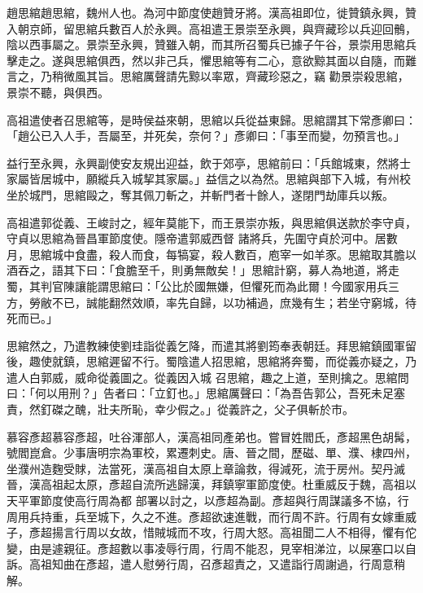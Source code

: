 \begin{pinyinscope}
 趙思綰趙思綰，魏州人也。為河中節度使趙贊牙將。漢高祖即位，徙贊鎮永興，贊入朝京師，留思綰兵數百人於永興。高祖遣王景崇至永興，與齊藏珍以兵迎回鶻，陰以西事屬之。景崇至永興，贊雖入朝，而其所召蜀兵已據子午谷，景崇用思綰兵擊走之。遂與思綰俱西，然以非己兵，懼思綰等有二心，意欲黥其面以自隨，而難言之，乃稍微風其旨。思綰厲聲請先黥以率眾，齊藏珍惡之，竊
 勸景崇殺思綰，景崇不聽，與俱西。



 高祖遣使者召思綰等，是時侯益來朝，思綰以兵從益東歸。思綰謂其下常彥卿曰：「趙公已入人手，吾屬至，并死矣，奈何？」彥卿曰：「事至而變，勿預言也。」



 益行至永興，永興副使安友規出迎益，飲于郊亭，思綰前曰：「兵館城東，然將士家屬皆居城中，願縱兵入城挈其家屬。」益信之以為然。思綰與部下入城，有州校坐於城門，思綰毆之，奪其佩刀斬之，并斬門者十餘人，遂閉門劫庫兵以叛。



 高祖遣郭從義、王峻討之，經年莫能下，而王景崇亦叛，與思綰俱送款於李守貞，守貞以思綰為晉昌軍節度使。隱帝遣郭威西督
 諸將兵，先圍守貞於河中。居數月，思綰城中食盡，殺人而食，每犒宴，殺人數百，庖宰一如羊豕。思綰取其膽以酒吞之，語其下曰：「食膽至千，則勇無敵矣！」思綰計窮，募人為地道，將走蜀，其判官陳讓能謂思綰曰：「公比於國無嫌，但懼死而為此爾！今國家用兵三方，勞敝不已，誠能翻然效順，率先自歸，以功補過，庶幾有生；若坐守窮城，待死而已。」



 思綰然之，乃遣教練使劉珪詣從義乞降，而遣其將劉筠奉表朝廷。拜思綰鎮國軍留後，趣使就鎮，思綰遲留不行。蜀陰遣人招思綰，思綰將奔蜀，而從義亦疑之，乃遣人白郭威，威命從義圖之。從義因入城
 召思綰，趣之上道，至則擒之。思綰問曰：「何以用刑？」告者曰：「立釘也。」思綰厲聲曰：「為吾告郭公，吾死未足塞責，然釘磔之醜，壯夫所恥，幸少假之。」從義許之，父子俱斬於市。



 慕容彥超慕容彥超，吐谷渾部人，漢高祖同產弟也。嘗冒姓閻氏，彥超黑色胡髯，號閻崑倉。少事唐明宗為軍校，累遷刺史。唐、晉之間，歷磁、單、濮、棣四州，坐濮州造麴受賕，法當死，漢高祖自太原上章論救，得減死，流于房州。契丹滅晉，漢高祖起太原，彥超自流所逃歸漢，拜鎮寧軍節度使。杜重威反于魏，高祖以天平軍節度使高行周為都
 部署以討之，以彥超為副。彥超與行周謀議多不協，行周用兵持重，兵至城下，久之不進。彥超欲速進戰，而行周不許。行周有女嫁重威子，彥超揚言行周以女故，惜賊城而不攻，行周大怒。高祖聞二人不相得，懼有佗變，由是遽親征。彥超數以事凌辱行周，行周不能忍，見宰相涕泣，以屎塞口以自訴。高祖知曲在彥超，遣人慰勞行周，召彥超責之，又遣詣行周謝過，行周意稍解。




\end{pinyinscope}
